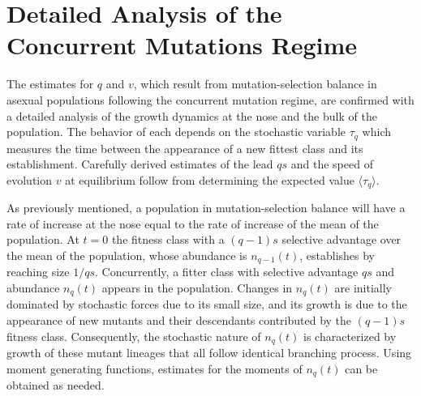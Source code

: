 \documentclass[12pt, one column]{article}
\begin{document}
\section*{Detailed Analysis of the Concurrent Mutations Regime}
The estimates for $q$ and $v$, which result from mutation-selection balance in asexual populations following the concurrent mutation regime, are confirmed with a detailed analysis of the growth dynamics at the nose and the bulk of the population.  The behavior of each depends on the stochastic variable $\tau_q$ which measures the time between the appearance of a new fittest class and its establishment.  Carefully derived estimates of the lead $qs$ and the speed of evolution $v$ at equilibrium follow from determining the expected value $\langle \tau_q \rangle$.   

As previously mentioned, a population in mutation-selection balance will have a rate of increase at the nose equal to the rate of increase of the mean of the population.  At $t=0$ the fitness class with a $(q-1)s$ selective advantage over the mean of the population, whose abundance is $n_{q-1}(t)$, establishes by reaching size $1/qs$.  Concurrently, a fitter class with selective advantage $qs$ and abundance $n_q(t)$ appears in the population.  Changes in $n_q(t)$ are initially dominated by stochastic forces due to its small size, and its growth is due to the appearance of new mutants and their descendants contributed by the $(q-1)s$ fitness class. Consequently, the stochastic nature of $n_q(t)$ is characterized by growth of these mutant lineages that all follow identical branching process.  Using moment generating functions, estimates for the moments of $n_q(t)$ can be obtained as needed.
\end{document}
